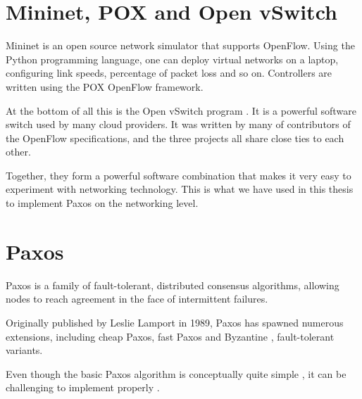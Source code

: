 \section{Mininet, POX and Open vSwitch}
\label{chapter:mininet}

Mininet \cite{github:mininet} is an open source network simulator that
supports OpenFlow.
%
Using the Python programming language, one can deploy virtual networks on a
laptop, configuring link speeds, percentage of packet loss and so on.
%
Controllers are written using the POX \cite{github:pox} OpenFlow framework.

At the bottom of all this is the Open vSwitch program \cite{github:ovs}.
It is a powerful software switch used by many cloud providers.  It was
written by many of contributors of the OpenFlow specifications, and the
three projects all share close ties to each other.

Together, they form a powerful software combination that makes it very easy
to experiment with networking technology.
%
This is what we have used in this thesis to implement Paxos on the
networking level.

\section{Paxos}
\label{chapter:background.paxos}

Paxos \cite{Lam01, Lamport:1998:PP:279227.279229} is a family of
fault-tolerant, distributed consensus algorithms, allowing nodes to reach
agreement in the face of intermittent failures.

Originally published by Leslie Lamport in 1989, Paxos
has spawned numerous extensions, including cheap Paxos,
 fast Paxos
 and Byzantine
, fault-tolerant variants.

Even though the basic Paxos algorithm is conceptually quite simple
\cite{Lam01}, it can be challenging to implement properly
\cite{Chandra:2007:PML:1281100.1281103}.

